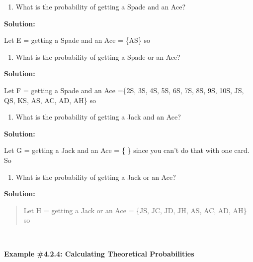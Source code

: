 \documentclass[]{book}
\providecommand{\tightlist}{%
  \setlength{\itemsep}{0pt}\setlength{\parskip}{0pt}}
\begin{document}
\begin{enumerate}
\def\labelenumi{\alph{enumi}.}
\setcounter{enumi}{5}
\tightlist
\item
  What is the probability of getting a Spade and an Ace?
\end{enumerate}

\textbf{Solution:}

Let E = getting a Spade and an Ace = \{AS\} so

\begin{enumerate}
\def\labelenumi{\alph{enumi}.}
\setcounter{enumi}{6}
\tightlist
\item
  What is the probability of getting a Spade or an Ace?
\end{enumerate}

\textbf{Solution:}

Let F = getting a Spade and an Ace =\{2S, 3S, 4S, 5S, 6S, 7S, 8S, 9S,
10S, JS, QS, KS, AS, AC, AD, AH\} so

\begin{enumerate}
\def\labelenumi{\alph{enumi}.}
\setcounter{enumi}{7}
\tightlist
\item
  What is the probability of getting a Jack and an Ace?
\end{enumerate}

\textbf{Solution:}

Let G = getting a Jack and an Ace = \{ \} since you can't do that with
one card. So

\begin{enumerate}
\def\labelenumi{\roman{enumi}.}
\tightlist
\item
  What is the probability of getting a Jack or an Ace?
\end{enumerate}

\textbf{Solution:}

\begin{quote}
Let H = getting a Jack or an Ace = \{JS, JC, JD, JH, AS, AC, AD, AH\} so
\end{quote}

\textbf{\\
}

\textbf{Example \#4.2.4: Calculating Theoretical Probabilities}
\end{document}
